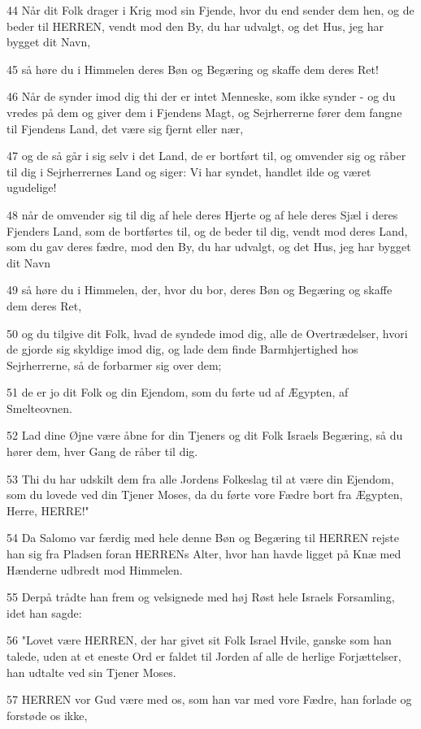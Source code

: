 \par 44 Når dit Folk drager i Krig mod sin Fjende, hvor du end sender dem hen, og de beder til HERREN, vendt mod den By, du har udvalgt, og det Hus, jeg har bygget dit Navn,
\par 45 så høre du i Himmelen deres Bøn og Begæring og skaffe dem deres Ret!
\par 46 Når de synder imod dig thi der er intet Menneske, som ikke synder - og du vredes på dem og giver dem i Fjendens Magt, og Sejrherrerne fører dem fangne til Fjendens Land, det være sig fjernt eller nær,
\par 47 og de så går i sig selv i det Land, de er bortført til, og omvender sig og råber til dig i Sejrherrernes Land og siger: Vi har syndet, handlet ilde og været ugudelige!
\par 48 når de omvender sig til dig af hele deres Hjerte og af hele deres Sjæl i deres Fjenders Land, som de bortførtes til, og de beder til dig, vendt mod deres Land, som du gav deres fædre, mod den By, du har udvalgt, og det Hus, jeg har bygget dit Navn
\par 49 så høre du i Himmelen, der, hvor du bor, deres Bøn og Begæring og skaffe dem deres Ret,
\par 50 og du tilgive dit Folk, hvad de syndede imod dig, alle de Overtrædelser, hvori de gjorde sig skyldige imod dig, og lade dem finde Barmhjertighed hos Sejrherrerne, så de forbarmer sig over dem;
\par 51 de er jo dit Folk og din Ejendom, som du førte ud af Ægypten, af Smelteovnen.
\par 52 Lad dine Øjne være åbne for din Tjeners og dit Folk Israels Begæring, så du hører dem, hver Gang de råber til dig.
\par 53 Thi du har udskilt dem fra alle Jordens Folkeslag til at være din Ejendom, som du lovede ved din Tjener Moses, da du førte vore Fædre bort fra Ægypten, Herre, HERRE!"
\par 54 Da Salomo var færdig med hele denne Bøn og Begæring til HERREN rejste han sig fra Pladsen foran HERRENs Alter, hvor han havde ligget på Knæ med Hænderne udbredt mod Himmelen.
\par 55 Derpå trådte han frem og velsignede med høj Røst hele Israels Forsamling, idet han sagde:
\par 56 "Lovet være HERREN, der har givet sit Folk Israel Hvile, ganske som han talede, uden at et eneste Ord er faldet til Jorden af alle de herlige Forjættelser, han udtalte ved sin Tjener Moses.
\par 57 HERREN vor Gud være med os, som han var med vore Fædre, han forlade og forstøde os ikke,
